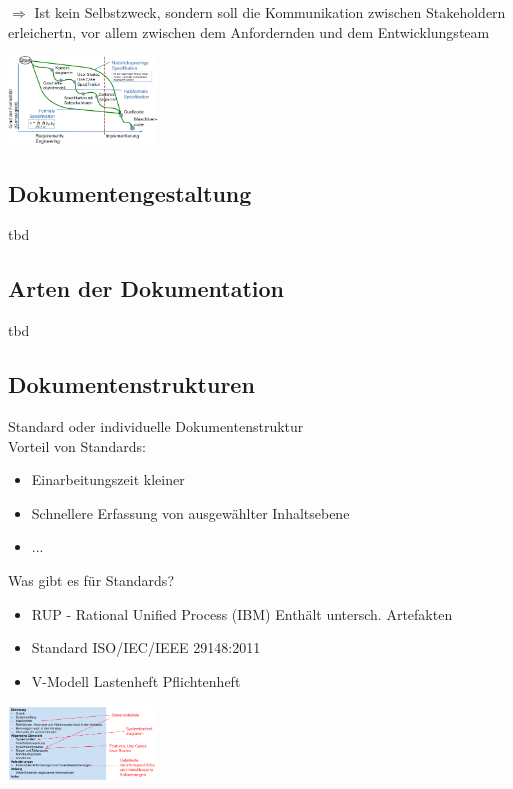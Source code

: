 \documentclass{report}
\newenvironment{Figure}
	{\par\medskip\noindent\minipage{\linewidth}}
	{\endminipage\par\medskip}
\theoremstyle{definition}
\theoremstyle{example}
\begin{document}
$\Rightarrow$ Ist kein Selbstzweck, sondern soll die Kommunikation zwischen Stakeholdern erleichertn, vor allem zwischen dem Anfordernden und dem Entwicklungsteam

\begin{Figure}
   \centering
    \includegraphics[width=150px]{img/Dokumentationsformen.png}
        \label{fig:Varianten der Dokumentationsformen}
\end{Figure}

\subsection{Dokumentengestaltung}
tbd

\subsection{Arten der Dokumentation}
tbd

\subsection{Dokumentenstrukturen}
Standard oder individuelle Dokumentenstruktur\\
Vorteil von Standards:
\begin{itemize}
   \item Einarbeitungszeit kleiner
   \item Schnellere Erfassung von ausgewählter Inhaltsebene
   \item ...
\end{itemize}

Was gibt es für Standards?
\begin{itemize}
   \item RUP - Rational Unified Process (IBM)
   \subitem Enthält untersch. Artefakten 
   \item Standard ISO/IEC/IEEE 29148:2011
   \item V-Modell
   \subitem Lastenheft
   \subitem Pflichtenheft 
\end{itemize}

\begin{Figure}
   \centering
    \includegraphics[width=150px]{img/Standardinhalte.png}
        \label{fig:Angepasste Standardinhalte SRS}
\end{Figure}
\end{document}
